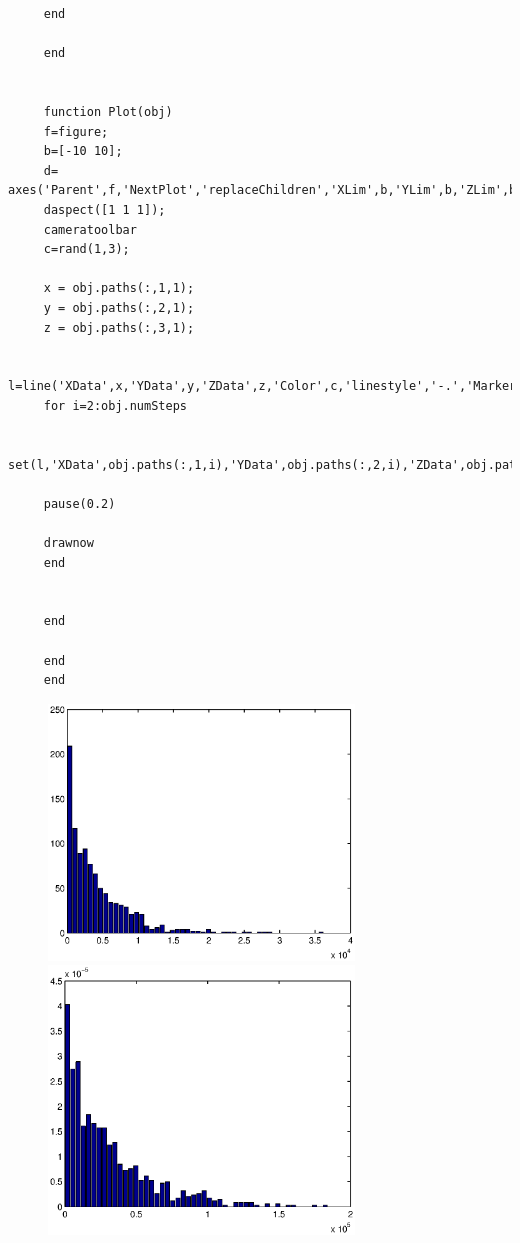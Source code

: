 \documentclass{article}
\begin{document}
\begin{lstlisting}
	 end
	 
	 end
	 
	 
	 function Plot(obj)
	 f=figure;
	 b=[-10 10];
	 d= axes('Parent',f,'NextPlot','replaceChildren','XLim',b,'YLim',b,'ZLim',b);
	 daspect([1 1 1]);
	 cameratoolbar
	 c=rand(1,3);
	 
	 x = obj.paths(:,1,1);
	 y = obj.paths(:,2,1);
	 z = obj.paths(:,3,1);
	 
	 l=line('XData',x,'YData',y,'ZData',z,'Color',c,'linestyle','-.','Marker','o','markersize',10,'Parent',d);
	 for i=2:obj.numSteps
	 
	 set(l,'XData',obj.paths(:,1,i),'YData',obj.paths(:,2,i),'ZData',obj.paths(:,3,i));
	 
	 pause(0.2)
	 
	 drawnow
	 end
	 
	 
	 end
	 
	 end
	 end
	 \end{lstlisting}
	 \begin{figure}
	 	\includegraphics[width=3.2in]{MetTime.eps} 
	 	\includegraphics[width=3.2in]{MetTime4.eps}
	 	\end{figure}
\end{document}
